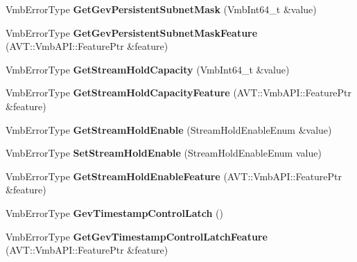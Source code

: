 \begin{DoxyCompactItemize}
\item 
\hypertarget{classMakoCamera_af689fc267db91f99e894c5fabdef5b72}{Vmb\-Error\-Type {\bfseries Get\-Gev\-Persistent\-Subnet\-Mask} (Vmb\-Int64\-\_\-t \&value)}\label{classMakoCamera_af689fc267db91f99e894c5fabdef5b72}

\item 
\hypertarget{classMakoCamera_aa6f31d3fefbac621f8be570be99c830d}{Vmb\-Error\-Type {\bfseries Get\-Gev\-Persistent\-Subnet\-Mask\-Feature} (A\-V\-T\-::\-Vmb\-A\-P\-I\-::\-Feature\-Ptr \&feature)}\label{classMakoCamera_aa6f31d3fefbac621f8be570be99c830d}

\item 
\hypertarget{classMakoCamera_a08802d811bfc061c0316c280350d431f}{Vmb\-Error\-Type {\bfseries Get\-Stream\-Hold\-Capacity} (Vmb\-Int64\-\_\-t \&value)}\label{classMakoCamera_a08802d811bfc061c0316c280350d431f}

\item 
\hypertarget{classMakoCamera_abacc43fccb9b65b306310ff0c897a7c9}{Vmb\-Error\-Type {\bfseries Get\-Stream\-Hold\-Capacity\-Feature} (A\-V\-T\-::\-Vmb\-A\-P\-I\-::\-Feature\-Ptr \&feature)}\label{classMakoCamera_abacc43fccb9b65b306310ff0c897a7c9}

\item 
\hypertarget{classMakoCamera_aed4c3888a687cbd7c36b86085b7b26f8}{Vmb\-Error\-Type {\bfseries Get\-Stream\-Hold\-Enable} (Stream\-Hold\-Enable\-Enum \&value)}\label{classMakoCamera_aed4c3888a687cbd7c36b86085b7b26f8}

\item 
\hypertarget{classMakoCamera_a0dfcf069cda67cadc49c0e2868c61b4c}{Vmb\-Error\-Type {\bfseries Set\-Stream\-Hold\-Enable} (Stream\-Hold\-Enable\-Enum value)}\label{classMakoCamera_a0dfcf069cda67cadc49c0e2868c61b4c}

\item 
\hypertarget{classMakoCamera_a2dd64a2510eff5fdbab98b4875b115f5}{Vmb\-Error\-Type {\bfseries Get\-Stream\-Hold\-Enable\-Feature} (A\-V\-T\-::\-Vmb\-A\-P\-I\-::\-Feature\-Ptr \&feature)}\label{classMakoCamera_a2dd64a2510eff5fdbab98b4875b115f5}

\item 
\hypertarget{classMakoCamera_a17c942aaed4fbba10bed2307da50711b}{Vmb\-Error\-Type {\bfseries Gev\-Timestamp\-Control\-Latch} ()}\label{classMakoCamera_a17c942aaed4fbba10bed2307da50711b}

\item 
\hypertarget{classMakoCamera_a32540c946c21437e4561a53505d80105}{Vmb\-Error\-Type {\bfseries Get\-Gev\-Timestamp\-Control\-Latch\-Feature} (A\-V\-T\-::\-Vmb\-A\-P\-I\-::\-Feature\-Ptr \&feature)}\label{classMakoCamera_a32540c946c21437e4561a53505d80105}


\end{DoxyCompactItemize}
